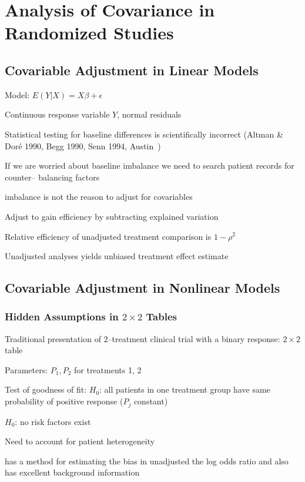 

\def\apacue{1}
\chapter{Analysis of Covariance in Randomized Studies}\label{chap:ancova}

\section{Covariable Adjustment in Linear
  Models} 
\bi
\item   Model: $E(Y | X) = X \beta + \epsilon$
\item   Continuous response variable $Y$, normal residuals
\item   Statistical testing for baseline differences is scientifically
        incorrect (Altman \& Dor\'{e} 1990, Begg 1990, Senn 1994,
        Austin~)
\item   If we are worried about baseline imbalance we need to search
        patient records for counter-- balancing factors
\item   \ra imbalance is not the reason to adjust for covariables
\item   Adjust to gain efficiency by subtracting explained variation
\item   Relative efficiency of unadjusted treatment comparison is $1-\rho^2$
\item   Unadjusted analyses yields unbiased treatment effect estimate
\ei

\section{Covariable Adjustment in Nonlinear Models}
\subsection{Hidden Assumptions in $2 \times 2$ Tables}
\bi
\item   Traditional presentation of 2--treatment clinical trial with a
        binary response: $2 \times 2$ table
\item   Parameters: $P_{1}, P_{2}$ for treatments 1, 2
\item   Test of goodness of fit: $H_0$: all patients in one treatment
        group have same probability of positive response ($P_j$ constant)
\item   \ra $H_0$: no risk factors exist
\item   Need to account for patient heterogeneity
\item   \cite{mat15inc} has a method for estimating the bias in
  unadjusted the log odds ratio and also has excellent background information
\ei

